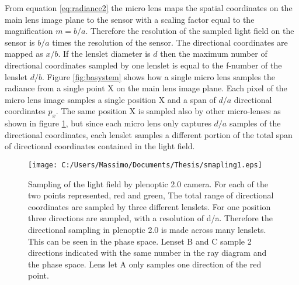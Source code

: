    From equation \ref{eq:radiance2} the micro lens maps the spatial coordinates on the main lens image plane to the sensor with a scaling factor equal to the magnification $m=b/a$. Therefore the resolution of the sampled light field on the sensor is $b/a$ times the resolution of the sensor. The directional coordinates are mapped as $x/b$. If the lenslet diameter is $d$ then the maximum number of directional coordinates sampled by one lenslet is equal to the f-number of the lenslet $d/b$. Figure \ref{fig:basystem} shows how a single micro lens samples the radiance from a single point X on the main lens image plane. Each pixel of the micro lens image samples a single position X and a span of $d/a$ directional coordinates $p_x$. The same position X is sampled also by other micro-lenses as shown in figure \ref{fig:phaseba}, but since each micro lens only captures $d/a$ samples of the directional coordinates, each lenslet samples a different portion of the total span of directional coordinates contained in the light field.
   \begin{figure}[H]
   	\centering
   	\texttt{[image: C:/Users/Massimo/Documents/Thesis/smapling1.eps]}
   	\caption{\label{fig:phaseba} Sampling of the light field by plenoptic 2.0 camera. For each of the two points represented, red and green, The total range of directional coordinates are sampled by three  different lenslets. For one position three directions are sampled, with a resolution of d/a. Therefore the directional sampling in plenoptic 2.0 is made across many lenslets. This can be seen in the phase space. Lenset B and C sample 2 directions indicated with the same number in the ray diagram and the phase space. Lens let A only samples one direction of the red point.   }
   \end{figure}

